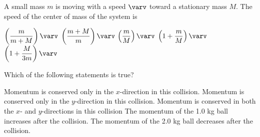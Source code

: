 \documentclass{../../../oss-classkick-exam}
\begin{document}
\begin{multicols*}{2}
\begin{questions}
    \question A small mass $m$ is moving with a speed $\varv$ toward a
    stationary mass $M$. The speed of the center of mass of the system is
    \begin{choices}
      \choice $\left(\dfrac{m}{m+M}\right)\varv$
      \choice $\left(\dfrac{m+M}{m}\right)\varv$
      \choice $\left(\dfrac{m}{M}\right)\varv$
      \choice $\left(1+\dfrac{m}{M}\right)\varv$
      \choice $\left(1+\dfrac{M}{3m}\right)\varv$
    \end{choices}


    \question Which of the following statements is true?
    \label{bfa1}
    \begin{choices}    
      \choice Momentum is conserved only in the $x$-direction in this collision.
      \choice Momentum is conserved only in the $y$-direction in this collision.
      \choice Momentum is conserved in both the $x$- and $y$-directions in this
      collision
      \choice The momentum of the 1.0 kg ball increases after the collision.
      \choice The momentum of the 2.0 kg ball decreases after the collision.
    \end{choices}
    \vspace{.7in}
    

\end{questions}
\end{multicols*}
\end{document}
